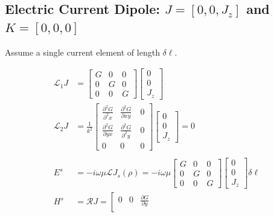\documentclass{article}
\newcommand{\0}{\varnothing}
\begin{document}
\newpage
\subsection{Electric Current Dipole: $J = [0,0,J_z]$ and $K = [0,0,0]$}

Assume a single current element of length $\delta \ell$. 

\begin{minipage}{0.5\textwidth}
\begin{align*}
	\mathcal{L}_1 J &= 
    \left[ \begin{array}{ccc} G & 0 & 0 \\ 
                            0 & G & 0\\ 
                            0 & 0 & G \end{array} \right]
        \left[ \begin{array}{c} 
        0 \\ 0 \\ J_z \end{array} \right]\\
	\mathcal{L}_2 J &= \frac{1}{k^2} \left[ \begin{array}{ccc} \frac{\partial^2 G }{\partial^2 x} & \frac{\partial^2 G }{\partial xy}\ & 0 \\ 
                            \frac{\partial^2 G}{\partial yx} & \frac{\partial^2 G}{\partial^2 y} &0\\ 
                            0 & 0 &0 \end{array} \right]
                                    \left[ \begin{array}{c} 
					        0 \\ 0 \\ J_z \end{array} \right] = 0\\
	\ \\
	E^s &= -i\omega\mu \mathcal{L} J_s(\rho) = -i\omega\mu \left[ \begin{array}{ccc} G & 0 & 0 \\ 
                            0 & G & 0\\ 
                            0 & 0 & G \end{array} \right]
        \left[ \begin{array}{c} 
        0 \\ 0 \\ J_z \end{array} \right] \delta \ell\\
         H^s &= \mathcal{R} J = \left[ \begin{array}{ccc} 0 & 0 & \frac{\partial G}{\partial y}\\ 

\end{array}
\end{align*}
\end{minipage}
\end{document}
